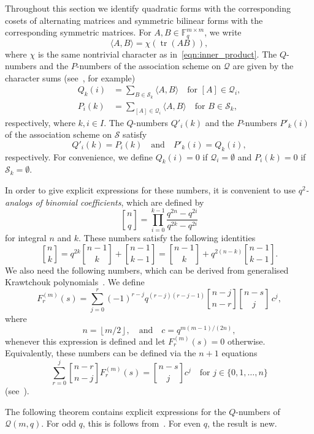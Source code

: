 \documentclass[10pt]{article}
\theoremstyle{definition}
\newcommand{\FF}{\mathbb{F}}
\newcommand{\Q}{\mathscr{Q}}
\renewcommand{\S}{\mathscr{S}}
\newcommand{\ang}[1]{\langle#1\rangle}
\DeclareMathOperator{\tr}{tr}
\begin{document}
Throughout this section we identify quadratic forms with the corresponding cosets of alternating matrices and symmetric bilinear forms with the corresponding symmetric matrices. For $A,B\in\FF_q^{m\times m}$, we write
\[
\ang{A,B}=\chi(\tr(AB)),
\]
where $\chi$ is the same nontrivial character as in~\eqref{eqn:inner_product}. 
The $Q$-numbers and the $P$-numbers of the association scheme on $\Q$ are given by the character sums (see~\cite[Section V]{DelLev1998}, for example)
\begin{align}
Q_k(i)&=\sum_{B\in\S_k}\ang{A,B}\quad \text{for $[A]\in\Q_i$},   \label{eqn:Q_char_sum}\\
P_i(k)&=\sum_{[A]\in\Q_i}\ang{A,B}\quad \text{for $B\in\S_k$},   \label{eqn:P_char_sum}
\end{align}
respectively, where $k,i\in I$. The $Q$-numbers $Q'_i(k)$ and the $P$-numbers $P'_k(i)$ of the association scheme on $\S$ satisfy
\[
Q'_i(k)=P_i(k)\quad\text{and}\quad P'_k(i)=Q_k(i),
\]
respectively. For convenience, we define $Q_k(i)=0$ if $\Q_i=\emptyset$ and $P_i(k)=0$ if $\S_k=\emptyset$. 
\par
In order to give explicit expressions for these numbers, it is convenient to use \emph{$q^2$-analogs of binomial coefficients}, which are defined by
\[
\genfrac{[}{]}{0pt}{}{n}{q}
=\prod_{i=0}^{k-1}\frac{q^{2n}-q^{2i}}{q^{2k}-q^{2i}}
\]
for integral $n$ and $k$. These numbers satisfy the following identities
\begin{equation}
%
\genfrac{[}{]}{0pt}{}{n}{k}
=q^{2k}
\genfrac{[}{]}{0pt}{}{n-1}{k}+\genfrac{[}{]}{0pt}{}{n-1}{k-1}=
\genfrac{[}{]}{0pt}{}{n-1}{k}+q^{2(n-k)}\genfrac{[}{]}{0pt}{}{n-1}{k-1}.   \label{eqn:Pascal_triangle}
\end{equation}
We also need the following numbers, which can be derived from generalised Krawtchouk polynomials~\cite{DelGoe1975,Del1976}. We define 
\[
F^{(m)}_r(s)=\sum_{j=0}^r(-1)^{r-j}q^{(r-j)(r-j-1)}
\genfrac{[}{]}{0pt}{}{n-j}{n-r}\genfrac{[}{]}{0pt}{}{n-s}{j}\, c^j,
\]
where
\[
n=\left\lfloor m/2\right\rfloor,\quad\text{and}\quad c=q^{m(m-1)/(2n)},
\]
whenever this expression is defined and let $F^{(m)}_r(s)=0$ otherwise. Equivalently, these numbers can be defined via the $n+1$ equations 
\begin{equation}
\sum_{r=0}^j\genfrac{[}{]}{0pt}{}{n-r}{n-j} F^{(m)}_r(s)=
\genfrac{[}{]}{0pt}{}{n-s}{j}c^j\quad\text{for $j\in\{0,1,\dots,n\}$}   \label{eqn:ev_transform}
\end{equation}
(see~\cite[(29)]{DelGoe1975}).
\par
The following theorem contains explicit expressions for the $Q$-numbers of $\Q(m,q)$. For odd $q$, this is follows from~\cite[Theorem~2.2]{Sch2015}. For even $q$, the result is new.
\end{document}
